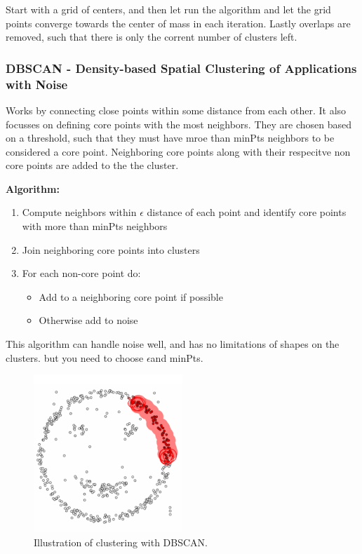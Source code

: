 \documentclass[a4paper]{article}
\begin{document}
Start with a grid of centers, and then let run the algorithm and let the grid points converge towards the center of mass in each iteration. Lastly overlaps are removed, such that there is only the corrent number of clusters left. 


\subsubsection{DBSCAN - Density-based Spatial Clustering of Applications with Noise}
Works by connecting close points within some distance from each other. It also focusses on defining core points with the most neighbors. They are chosen based on a threshold, such that they must have mroe than minPts neighbors to be considered a core point. Neighboring core points along with their respecitve non core points are added to the the cluster.

\textbf{Algorithm:} 
\begin{enumerate}
	\item Compute neighbors within $ \epsilon $ distance of each point and identify core points with more than minPts neighbors
	\item Join neighboring core points into clusters
	\item For each non-core point do:
		\begin{itemize}
			\item Add to a neighboring core point if possible
			\item Otherwise add to noise
		\end{itemize}
\end{enumerate}

This algorithm can handle noise well, and has no limitations of shapes on the clusters. but you need to choose $ \epsilon $and minPts. 

\begin{figure}[H]
\centering
\includegraphics[width=0.5\textwidth]{figures/DBSCSAN.png}
\caption{Illustration of clustering with DBSCAN.}
\label{fig:DBSCAN}
\end{figure} 
\end{document}
